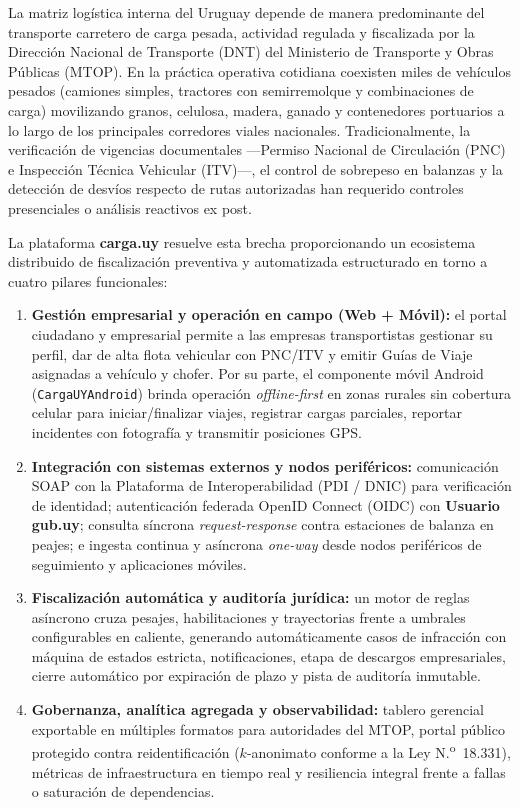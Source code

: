 \documentclass[11pt,a4paper,twocolumn]{article}
\begin{document}
La matriz logística interna del Uruguay depende de manera predominante del transporte carretero de carga pesada, actividad regulada y fiscalizada por la Dirección Nacional de Transporte (DNT) del Ministerio de Transporte y Obras Públicas (MTOP). En la práctica operativa cotidiana coexisten miles de vehículos pesados (camiones simples, tractores con semirremolque y combinaciones de carga) movilizando granos, celulosa, madera, ganado y contenedores portuarios a lo largo de los principales corredores viales nacionales. Tradicionalmente, la verificación de vigencias documentales ---Permiso Nacional de Circulación (PNC) e Inspección Técnica Vehicular (ITV)---, el control de sobrepeso en balanzas y la detección de desvíos respecto de rutas autorizadas han requerido controles presenciales o análisis reactivos ex post.

La plataforma \textbf{carga.uy} resuelve esta brecha proporcionando un ecosistema distribuido de fiscalización preventiva y automatizada estructurado en torno a cuatro pilares funcionales:
\begin{enumerate}
    \item \textbf{Gestión empresarial y operación en campo (Web + Móvil):} el portal ciudadano y empresarial permite a las empresas transportistas gestionar su perfil, dar de alta flota vehicular con PNC/ITV y emitir Guías de Viaje asignadas a vehículo y chofer. Por su parte, el componente móvil Android (\texttt{CargaUYAndroid}) brinda operación \textit{offline-first} en zonas rurales sin cobertura celular para iniciar/finalizar viajes, registrar cargas parciales, reportar incidentes con fotografía y transmitir posiciones GPS.
    \item \textbf{Integración con sistemas externos y nodos periféricos:} comunicación SOAP con la Plataforma de Interoperabilidad (PDI / DNIC) para verificación de identidad; autenticación federada OpenID Connect (OIDC) con \textbf{Usuario gub.uy}; consulta síncrona \textit{request-response} contra estaciones de balanza en peajes; e ingesta continua y asíncrona \textit{one-way} desde nodos periféricos de seguimiento y aplicaciones móviles.
    \item \textbf{Fiscalización automática y auditoría jurídica:} un motor de reglas asíncrono cruza pesajes, habilitaciones y trayectorias frente a umbrales configurables en caliente, generando automáticamente casos de infracción con máquina de estados estricta, notificaciones, etapa de descargos empresariales, cierre automático por expiración de plazo y pista de auditoría inmutable.
    \item \textbf{Gobernanza, analítica agregada y observabilidad:} tablero gerencial exportable en múltiples formatos para autoridades del MTOP, portal público protegido contra reidentificación ($k$-anonimato conforme a la Ley N.\textsuperscript{o}~18.331), métricas de infraestructura en tiempo real y resiliencia integral frente a fallas o saturación de dependencias.
\end{enumerate}
\end{document}
